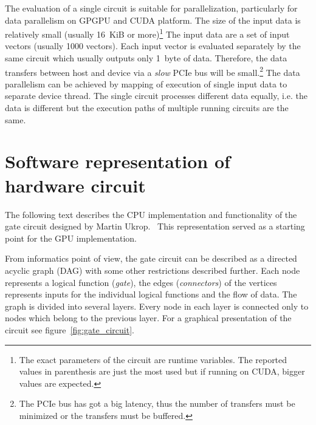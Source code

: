 \documentclass[12pt,oneside]{fithesis2}
\begin{document}
The evaluation of a single circuit is suitable for parallelization, particularly for data parallelism on GPGPU and CUDA platform. The size of the input data is relatively small (usually 16~KiB or more)\footnote{The exact parameters of the circuit are runtime variables. The reported values in parenthesis are just the most used but if running on CUDA, bigger values are expected.} The input data are a set of input vectors (usually 1000 vectors). Each input vector is evaluated separately by the same circuit which usually outputs only 1~byte of data. Therefore, the data transfers between host and device via a \emph{slow} PCIe bus will be small.\footnote{The PCIe bus has got a big latency, thus the number of transfers must be minimized or the transfers must be buffered.} The data parallelism can be achieved by mapping of execution of single input data to separate device thread. The single circuit processes different data equally, i.e. the data is different but the execution paths of multiple running circuits are the same.


\section{Software representation of hardware circuit}

The following text describes the CPU implementation and functionality of the gate circuit designed by Martin Ukrop.~\cite{ukrop_thesis} This representation served as a starting point for the GPU implementation.

From informatics point of view, the gate circuit can be described as a directed acyclic graph (DAG) with some other restrictions described further. Each node represents a logical function (\emph{gate}), the edges (\emph{connectors}) of the vertices represents inputs for the individual logical functions and the flow of data. The graph is divided into several layers. Every node in each layer is connected only to nodes which belong to the previous layer. For a graphical presentation of the circuit see figure~\ref{fig:gate_circuit}.~\cite{eacirc_circuit}
\end{document}
